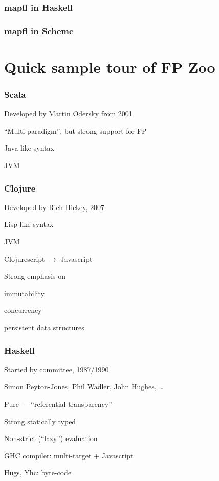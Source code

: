 \begin{frame}
\frametitle{mapfl in Haskell}

\end{frame}

\begin{frame}
\frametitle{mapfl in Scheme}

\end{frame}

\section{Quick sample tour of FP Zoo}

\begin{frame}
\frametitle{Scala}
\bi
\item Developed by Martin Odersky from 2001
\item ``Multi-paradigm'', but strong support for FP
\item Java-like syntax
\item JVM
\ei
\end{frame}

\begin{frame}
\frametitle{Clojure}
\bi
\item Developed by Rich Hickey, 2007
\item Lisp-like syntax
\item JVM
\bi
\item Clojurescript $\longrightarrow$ Javascript
\ei
\item Strong emphasis on
\bi
\item immutability
\item concurrency
\item persistent data structures
\ei
\ei
\end{frame}

\begin{frame}
\frametitle{Haskell}
\bi
\item Started by committee, 1987{\slash}1990
\bi
\item {\small Simon Peyton-Jones, Phil Wadler, John Hughes, \ldots}
\ei
\item Pure --- ``referential transparency''
\item Strong statically typed
\item Non-strict (``lazy'') evaluation
\item GHC compiler: multi-target + Javascript
\item Hugs, Yhc: byte-code
\ei
\end{frame}

